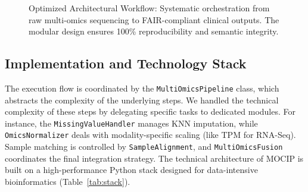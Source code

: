 \documentclass[runningheads]{llncs}
\begin{document}
\begin{figure}[H]
{
}
\caption{Optimized Architectural Workflow: Systematic orchestration from raw multi-omics sequencing to FAIR-compliant clinical outputs. The modular design ensures 100\% reproducibility and semantic integrity.}\label{fig:pipeline_dag}
\end{figure}

\subsection{Implementation and Technology Stack}
The execution flow is coordinated by the \texttt{MultiOmicsPipeline} class, which abstracts the complexity of the underlying steps. We handled the technical complexity of these steps by delegating specific tasks to dedicated modules. For instance, the \texttt{MissingValueHandler} manages KNN imputation, while \texttt{OmicsNormalizer} deals with modality-specific scaling (like TPM for RNA-Seq). Sample matching is controlled by \texttt{SampleAlignment}, and \texttt{MultiOmicsFusion} coordinates the final integration strategy. The technical architecture of MOCIP is built on a high-performance Python stack designed for data-intensive bioinformatics (Table~\ref{tab:stack}).
\end{document}

